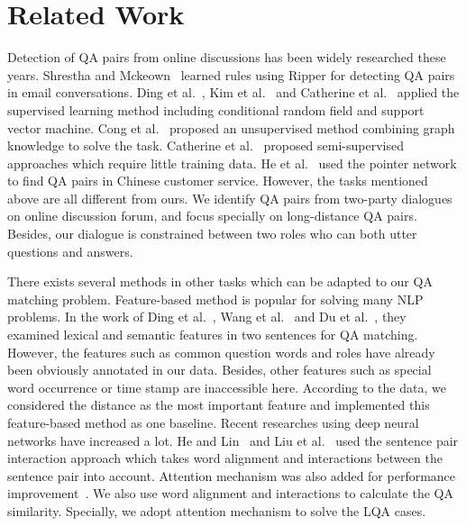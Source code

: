 \section{Related Work}
\label{sec:relatedwork}


 
Detection of QA pairs from online discussions has been widely researched these years. Shrestha and Mckeown~ learned rules using Ripper for detecting QA pairs in email conversations. Ding et al.~, Kim et al.~ and Catherine et al.~ applied the supervised learning method including conditional random field and support vector machine. Cong et al.~ proposed an unsupervised method combining graph knowledge to solve the task. Catherine et al.~ proposed semi-supervised approaches which require little training data. He et al.~ used the pointer network to find QA pairs in Chinese customer service. 
However, the tasks mentioned above are all different from ours. 
We identify QA pairs from two-party dialogues on online discussion forum, 
and focus specially on long-distance QA pairs. Besides, our 
dialogue is constrained between two roles who can both utter questions and  answers.

There exists several methods in other tasks which can be adapted to 
our QA matching problem. Feature-based method is popular for solving 
many NLP problems. In the work of Ding et al.~, 
Wang et al.~ and 
Du et al.~, 
they examined lexical and semantic features in two sentences 
for QA matching. However, the features such as common question words 
and roles have already been obviously annotated in our data. 
Besides, other features such as special word occurrence or time stamp are 
inaccessible here. According to the data, we considered the distance as 
the most important feature and implemented this feature-based method as one 
baseline. Recent researches using deep neural networks have increased a lot. 
He and Lin~ and 
Liu et al.~ used the sentence pair interaction 
approach which takes word alignment and interactions between the sentence 
pair into account. Attention mechanism was also added for performance 
improvement~\cite{rocktaschel2015reasoning,wang2015learning,chen2016enhanced}. 
We also use word alignment and interactions to calculate the QA similarity. 
Specially, we adopt attention mechanism to solve the LQA cases.


